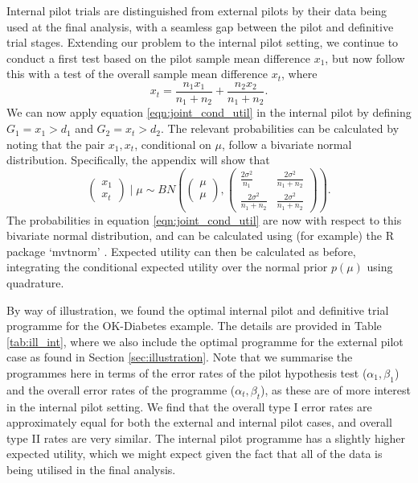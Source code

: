 \documentclass[sagev, Crown]{sagej} %
\begin{document}
Internal pilot trials are distinguished from external pilots by their data being used at the final analysis, with a seamless gap between the pilot and definitive trial stages. Extending our problem to the internal pilot setting, we continue to conduct a first test based on the pilot sample mean difference $x_1$, but now follow this with a test of the overall sample mean difference $x_t$, where
$$
x_t = \frac{n_1 x_1}{n_1 + n_2} + \frac{n_2 x_2}{n_1 + n_2}.
$$
We can now apply equation \ref{eqn:joint_cond_util} in the internal pilot by defining $G_1 = x_1 > d_1$ and $G_2 = x_t > d_2$. The relevant probabilities can be calculated by noting that the pair $x_1, x_t$, conditional on $\mu$, follow a bivariate normal distribution. Specifically, the appendix will show that
$$
\begin{pmatrix}
x_1 \\
x_t
\end{pmatrix} \mid \mu
\sim BN\left( 
\begin{pmatrix}
\mu \\
\mu
\end{pmatrix},
\begin{pmatrix}
\frac{2\sigma^2}{n_1} & \frac{2\sigma^2}{n_1 + n_2} \\
\frac{2\sigma^2}{n_1 + n_2} & \frac{2\sigma^2}{n_1 + n_2}
\end{pmatrix} \right).
$$
The probabilities in equation \ref{eqn:joint_cond_util} are now with respect to this bivariate normal distribution, and can be calculated using (for example) the R package `mvtnorm' \cite{Genz2017}. Expected utility can then be calculated as before, integrating the conditional expected utility over the normal prior $p(\mu)$ using quadrature.

By way of illustration, we found the optimal internal pilot and definitive trial programme for the OK-Diabetes example. The details are provided in Table \ref{tab:ill_int}, where we also include the optimal programme for the external pilot case as found in Section \ref{sec:illustration}. Note that we summarise the programmes here in terms of the error rates of the pilot hypothesis test ($\alpha_1, \beta_1$) and the overall error rates of the programme ($\alpha_t, \beta_t$), as these are of more interest in the internal pilot setting. We find that the overall type I error rates are approximately equal for both the  external and internal pilot cases, and overall type II rates are very similar. The internal pilot programme has a slightly higher expected utility, which we might expect given the fact that all of the data is being utilised in the final analysis.
\end{document}
